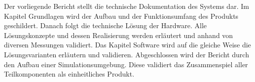 Der vorliegende Bericht stellt die technische Dokumentation des Systems dar. Im Kapitel Grundlagen wird der Aufbau und der Funktionsumfang des Produkts geschildert. Danach folgt die technische Lösung der Hardware. Alle Lösungskonzepte und dessen Realisierung werden erläutert und anhand von diversen Messungen validiert. Das Kapitel Software wird auf die gleiche Weise die Lösungsvarianten erläutern und validieren.
Abgeschlossen wird der Bericht durch den Aufbau einer Simulationsumgebung. Diese validiert das Zusammenspiel aller Teilkomponenten als einheitliches Produkt.
